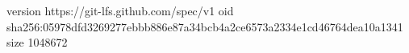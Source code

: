 version https://git-lfs.github.com/spec/v1
oid sha256:05978dfd3269277ebbb886e87a34bcb4a2ce6573a2334e1cd46764dea10a1341
size 1048672
